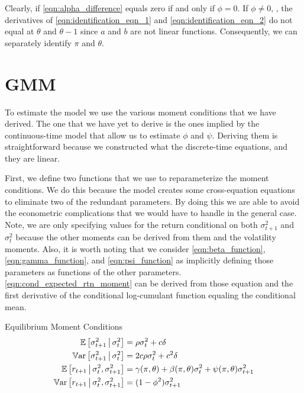 \documentclass[11pt, letterpaper, twoside, final]{article}
\begin{document}
Clearly, if \cref{eqn:alpha_difference} equals zero if and only if $\phi = 0$.
If $\phi \neq 0$, , the derivatives of \cref{eqn:identification_eqn_1} and \cref{eqn:identification_eqn_2}  do not
equal at $\theta$ and $\theta-1$ since $a$ and $b$ are not linear functions.
Consequently, we can separately identify $\pi$ and $\theta$.

\section{GMM}\label{sec:GMM}

To estimate the model we use the various moment conditions that we have derived.
The one that we have yet to derive is the ones implied by the continuous-time model that allow us to estimate
$\phi$ and $\psi$.
Deriving them is straightforward because we constructed what the discrete-time equations, and they are linear.

First, we define two functions that we use to reparameterize the moment conditions.
We do this because the model creates some cross-equation equations to eliminate two of the redundant parameters.
By doing this we are able to avoid the econometric complications that we would have to handle in the general
case.
Note, we are only specifying values for the return conditional on both $\sigma^2_{t+1}$ and $\sigma^2_t$ because
the other moments can be derived from them and the volatility moments.
Also, it is worth noting that we consider \cref{eqn:beta_function}, \cref{eqn:gamma_function}, and
\cref{eqn:psi_function} as implicitly defining those parameters as functions of the other parameters.
\cref{eqn:cond_expected_rtn_moment} can be derived from those equation and the first derivative of the conditional
log-cumulant function equaling the conditional mean.


\begin{defn}{Equilibrium Moment Conditions}
    \label{defn:equilibrium_moment_conditions}
    \begin{align}
        \label{eqn:cond_vol_mean}
        \E\left[\sigma^2_{t+1} \mvert \sigma^2_t \right]  &= \rho \sigma^2_t  + c \delta\\
%
        \label{eqn:cond_vol_var}
        \Var\left[\sigma^2_{t+1} \mvert \sigma^2_t \right]  &=  2 c \rho \sigma^2_t  + c^2 \delta \\
%
        \label{eqn:cond_expected_rtn_moment}
        \E\left[r_{t+1} \mvert \sigma^2_t, \sigma^2_{t+1}\right] &= \gamma(\pi, \theta) + \beta(\pi, \theta)
        \sigma^2_t + \psi(\pi, \theta) \sigma^2_{t+1} \\
%
        \label{eqn:cond_rtn_var}
        \Var\left[r_{t+1} \mvert \sigma^2_t, \sigma^2_{t+1}\right] &= (1 - \phi^2) \sigma^2_{t+1} 
\end{align}
\end{defn}
\end{document}
